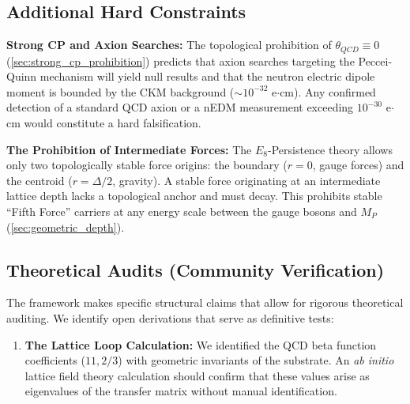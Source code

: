 \subsection{Additional Hard Constraints}

\textbf{Strong CP and Axion Searches:} The topological prohibition of $\theta_{QCD} \equiv 0$ (\cref{sec:strong_cp_prohibition}) predicts that axion searches targeting the Peccei-Quinn mechanism will yield null results and that the neutron electric dipole moment is bounded by the CKM background ($\sim 10^{-32}$ e$\cdot$cm). Any confirmed detection of a standard QCD axion or a nEDM measurement exceeding $10^{-30}$ e$\cdot$cm would constitute a hard falsification.

\textbf{The Prohibition of Intermediate Forces:} The $E_8$-Persistence theory allows only two topologically stable force origins: the boundary ($r=0$, gauge forces) and the centroid ($r=\Delta/2$, gravity). A stable force originating at an intermediate lattice depth lacks a topological anchor and must decay. This prohibits stable ``Fifth Force'' carriers at any energy scale between the gauge bosons and $M_P$ (\cref{sec:geometric_depth}).

\subsection{Theoretical Audits (Community Verification)}

The framework makes specific structural claims that allow for rigorous theoretical auditing. We identify open derivations that serve as definitive tests:

\begin{enumerate}
    \item \textbf{The Lattice Loop Calculation:} We identified the QCD beta function coefficients ($11, 2/3$) with geometric invariants of the substrate. An \textit{ab initio} lattice field theory calculation should confirm that these values arise as eigenvalues of the transfer matrix without manual identification.
\end{enumerate}
